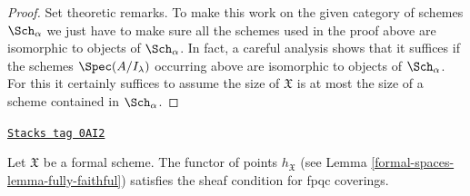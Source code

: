 \begin{proof}
\medskip\noindent
Set theoretic remarks. To make this work on the given category
of schemes $\Sch_\alpha$ we just have to make sure all the
schemes used in the proof above are isomorphic to objects of $\Sch_\alpha$.
In fact, a careful analysis shows that it suffices if the
schemes $\Spec(A/I_\lambda)$ occurring above are isomorphic to
objects of $\Sch_\alpha$. For this it certainly suffices to assume
the size of $\mathfrak X$ is at most the size of
a scheme contained in $\Sch_\alpha$.
\end{proof}

\begin{lemma}
\label{formal-spaces-lemma-formal-scheme-sheaf-fppf}
\href{https://stacks.math.columbia.edu/tag/0AI2}{\texttt{Stacks tag 0AI2}}


Let $\mathfrak X$ be a formal scheme. The functor of points
$h_\mathfrak X$ (see Lemma \ref{formal-spaces-lemma-fully-faithful})
satisfies the sheaf condition for fpqc coverings.
\end{lemma}

